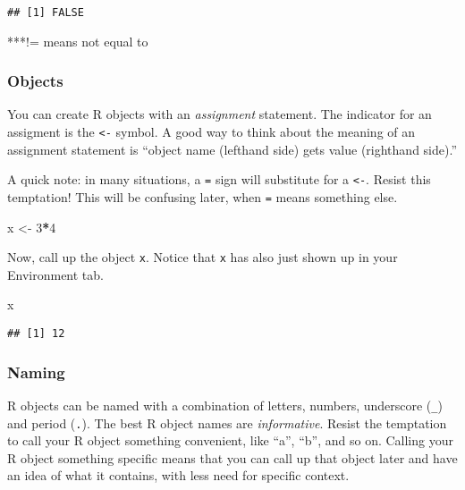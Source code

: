 \documentclass[
]{article}
\newenvironment{Shaded}{\begin{snugshade}}{\end{snugshade}}
\newcommand{\DecValTok}[1]{\textcolor[rgb]{0.00,0.00,0.81}{#1}}
\newcommand{\NormalTok}[1]{#1}
\newcommand{\OperatorTok}[1]{\textcolor[rgb]{0.81,0.36,0.00}{\textbf{#1}}}
\newcommand{\StringTok}[1]{\textcolor[rgb]{0.31,0.60,0.02}{#1}}
\begin{document}
\begin{verbatim}
## [1] FALSE
\end{verbatim}

***!= means not equal to

\hypertarget{objects}{%
\subsubsection{Objects}\label{objects}}

You can create R objects with an \emph{assignment} statement. The
indicator for an assigment is the \texttt{\textless{}-} symbol. A good
way to think about the meaning of an assignment statement is ``object
name (lefthand side) gets value (righthand side).''

A quick note: in many situations, a \texttt{=} sign will substitute for
a \texttt{\textless{}-}. Resist this temptation! This will be confusing
later, when \texttt{=} means something else.

\begin{Shaded}
\begin{Highlighting}[]
\NormalTok{x <-}\StringTok{ }\DecValTok{3}\OperatorTok{*}\DecValTok{4}
\end{Highlighting}
\end{Shaded}

Now, call up the object \texttt{x}. Notice that \texttt{x} has also just
shown up in your Environment tab.

\begin{Shaded}
\begin{Highlighting}[]
\NormalTok{x}
\end{Highlighting}
\end{Shaded}

\begin{verbatim}
## [1] 12
\end{verbatim}

\hypertarget{naming}{%
\subsubsection{Naming}\label{naming}}

R objects can be named with a combination of letters, numbers,
underscore (\texttt{\_}) and period (\texttt{.}). The best R object
names are \emph{informative}. Resist the temptation to call your R
object something convenient, like ``a'', ``b'', and so on. Calling your
R object something specific means that you can call up that object later
and have an idea of what it contains, with less need for specific
context.
\end{document}
